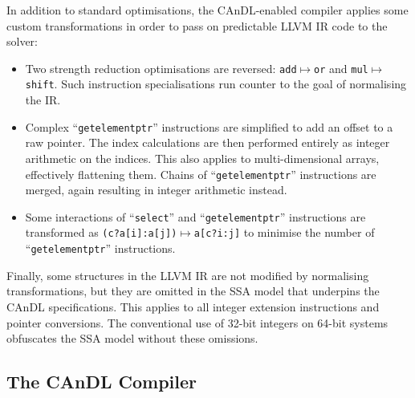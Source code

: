     In addition to standard optimisations, the CAnDL-enabled compiler applies
    some custom transformations in order to pass on predictable LLVM IR code
    to the solver:
    \begin{itemize}
        \item Two strength reduction optimisations are reversed:
              {\tt add}$\mapsto${\tt or} and {\tt mul}$\mapsto${\tt shift}.
              Such instruction specialisations run counter to the goal of
              normalising the IR.
        \item Complex ``{\tt getelementptr}'' instructions are simplified to
              add an offset to a raw pointer.
              The index calculations are then performed entirely as integer
              arithmetic on the indices.
              This also applies to multi-dimensional arrays, effectively
              flattening them.
              Chains of ``{\tt getelementptr}'' instructions are merged, again
              resulting in integer arithmetic instead.
        \item Some interactions of ``{\tt select}'' and
              ``{\tt getelementptr}'' instructions are transformed as
              {\tt (c?a[i]:a[j])}$\mapsto${\tt a[c?i:j]} to minimise the number
              of ``{\tt getelementptr}'' instructions.
    \end{itemize}
    Finally, some structures in the LLVM IR are not modified by normalising
    transformations, but they are omitted in the SSA model that underpins the
    CAnDL specifications.
    This applies to all integer extension instructions and pointer conversions.
    The conventional use of 32-bit integers on 64-bit systems obfuscates the
    SSA model without these omissions.

\subsection{The CAnDL Compiler}

